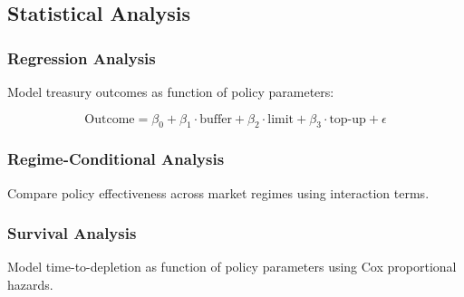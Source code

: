 \subsection{Statistical Analysis}

\subsubsection{Regression Analysis}

Model treasury outcomes as function of policy parameters:

\begin{equation}
\text{Outcome} = \beta_0 + \beta_1 \cdot \text{buffer} + \beta_2 \cdot \text{limit} + \beta_3 \cdot \text{top-up} + \epsilon
\end{equation}

\subsubsection{Regime-Conditional Analysis}

Compare policy effectiveness across market regimes using interaction terms.

\subsubsection{Survival Analysis}

Model time-to-depletion as function of policy parameters using Cox proportional hazards.

